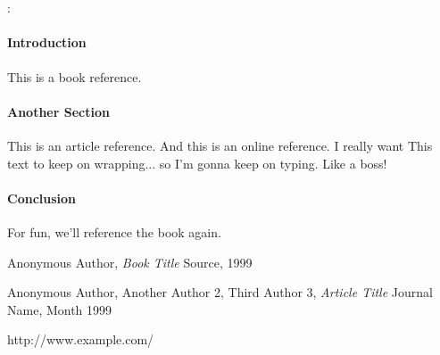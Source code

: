 \documentclass[12pt,oneside]{article}
\begin{document}


\begin{center}
{\large\bf \projectTitle \\ ~\\}
{\teamName: \\\teamMembers}
\end{center}

\doublespace

\paragraph{Introduction}
This is a book reference.\cite{book99}

\paragraph{Another Section}
This is an article reference.\cite{journal99} And this is an online reference.\cite{url99} I really want
This text to keep on wrapping... so I'm gonna keep on typing. Like a boss!

\paragraph{Conclusion}
For fun, we'll reference the book again.\cite{book99}

\singlespace

\begin{thebibliography}{99}

    Anonymous Author,
    \emph{Book Title}
    Source,
    1999

    Anonymous Author,
        Another Author 2,
        Third Author 3,
    \emph{Article Title}
    Journal Name,
    Month 1999

    http://www.example.com/

\end{thebibliography}
\end{document}
